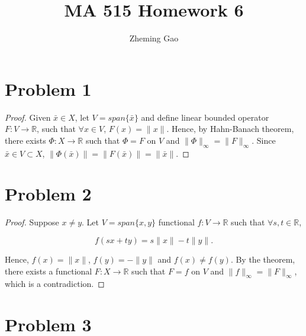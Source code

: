 \documentclass[12pt]{article}
\begin{document}
 
 
\title{MA 515 Homework 6}
\author{Zheming Gao}
\maketitle

\section*{Problem 1}

\begin{proof}

Given $\bar x \in X$, let $V = span \{\bar x\}$ and define linear bounded operator $F: V \rightarrow \mathbb R$, such that $\forall x \in V$, $F(x) = \|x\|$. Hence, by Hahn-Banach theorem, there exists $\Phi: X\rightarrow \mathbb R$ such that $\Phi = F$ on $V$ and $\|\Phi\|_\infty = \|F\|_\infty$. Since $\bar x \in V\subset X$, $\|\Phi(\bar x)\| =  \|F(\bar x)\| = \|\bar x\|$.

\end{proof}

\section*{Problem 2}

\begin{proof}

Suppose $x \neq y$. Let $V = span\{x, y\}$ functional $f: V\rightarrow \mathbb R $ such that $\forall s, t\in \mathbb R$, 

$$
f(sx + ty) = s\|x\| - t\|y\|.
$$

Hence, $f(x) = \|x\|$, $f(y) = -\|y\|$ and $f(x)\neq f(y)$. By the theorem, there exists a functional $F: X\rightarrow \mathbb R$ such that $F = f$ on $V$ and $\|f\|_\infty = \|F\|_\infty$, which is a contradiction.

\end{proof}

\section*{Problem 3}
\end{document}
